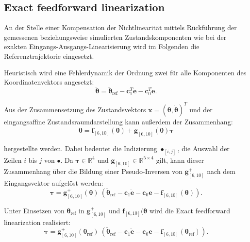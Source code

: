 \subsection{Exact feedforward linearization}
An der Stelle einer Kompensation der Nichtlinearität mittels Rückführung der gemessenen beziehungsweise simulierten Zustandskomponenten wie bei der exakten Eingangs-Ausgangs-Linearisierung wird im Folgenden die Referenztrajektorie eingesetzt. \cite{Hagenmeyer2003}

Heuristisch wird eine Fehlerdynamik der Ordnung zwei für alle Komponenten des Koordinatenvektors angesetzt:
\begin{equation}
	\ddot{\mathbf{\theta}} = \ddot{\mathbf{\theta}}_{\text{ref}} - \mathbf{c}_1^T \dot{\mathbf{e}} - \mathbf{c}_0^T \mathbf{e}.
\end{equation}

Aus der Zusammensetzung des Zustandsvektors $\mathbf{x} = (\mathbf{\theta}, \dot{\mathbf{\theta}})^T$ und der eingangsaffine Zustandsraumdarstellung kann außerdem der Zusammenhang:
\begin{equation}
	\ddot{\mathbf{\theta}} = \mathbf{f}_{[6, 10]}(\mathbf{\theta}) + \mathbf{g}_{[6, 10]}(\mathbf{\theta}) \mathbf{\tau}
\end{equation}

hergestellte werden. Dabei bedeutet die Indizierung $\bullet_{[i, j]}$, die Auswahl der Zeilen $i$ bis $j$ von $\bullet$. Da $\mathbf{\tau} \in \mathbb{R}^4$ und $\mathbf{g}_{[6, 10]} \in \mathbb{R}^{5 \times 4}$ gilt, kann dieser Zusammenhang über die Bildung einer Pseudo-Inversen von $\mathbf{g}_{[6, 10]}^+$ nach dem Eingangsvektor aufgelöst werden:
\begin{equation}
	\mathbf{\tau}= \mathbf{g}^{+}_{[6, 10]} (\mathbf{\theta}) \ (\ddot{\mathbf{\theta}}_{\text{ref}} - \mathbf{c}_{1} \mathbf{\dot{e}} - \mathbf{c}_{0} \mathbf{e} - \mathbf{f}_{[6, 10]}(\mathbf{\theta})).
\end{equation} 

Unter Einsetzen von $\mathbf{\theta}_{\text{ref}}$ in $\mathbf{g}_{[6, 10]}^+$ und $\mathbf{f}_{[6, 10]}(\mathbf{\theta}$ wird die Exact feedforward linearization realisiert:
\begin{equation}
\mathbf{\tau}= \mathbf{g}^{+}_{[6, 10]} (\mathbf{\theta}_{\text{ref}}) \ (\ddot{\mathbf{\theta}}_{\text{ref}} - \mathbf{c}_{1} \mathbf{\dot{e}} - \mathbf{c}_{0} \mathbf{e} - \mathbf{f}_{[6, 10]}(\mathbf{\theta}_{\text{ref}})).
\end{equation} 

